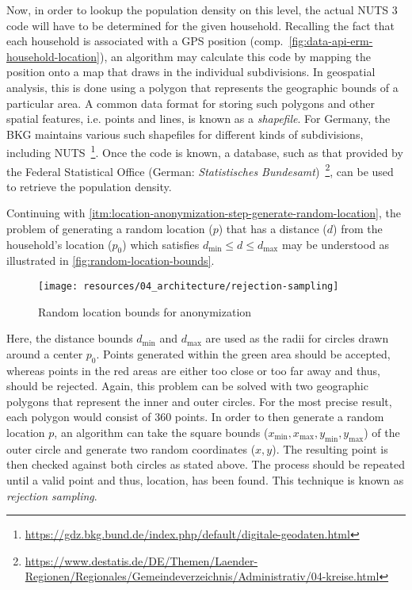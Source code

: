 Now, in order to lookup the population density on this level, the actual \acs{NUTS} 3 code will have to be determined for the given household. Recalling the fact that each household is associated with a \ac{GPS} position (comp.~\autoref{fig:data-api-erm-household-location}), an algorithm may calculate this code by mapping the position onto a map that draws in the individual subdivisions. In geospatial analysis, this is done using a polygon that represents the geographic bounds of a particular area. A common data format for storing such polygons and other spatial features, i.e. points and lines, is known as a \textit{shapefile}. For Germany, the \ac{BKG} maintains various such shapefiles for different kinds of subdivisions, including \acs{NUTS}~\footnote{\url{https://gdz.bkg.bund.de/index.php/default/digitale-geodaten.html}}. Once the code is known, a database, such as that provided by the Federal Statistical Office (German: \textit{Statistisches Bundesamt})~\footnote{\url{https://www.destatis.de/DE/Themen/Laender-Regionen/Regionales/Gemeindeverzeichnis/Administrativ/04-kreise.html}}, can be used to retrieve the population density.

Continuing with \ref{itm:location-anonymization-step-generate-random-location}, the problem of generating a random location ($p$) that has a distance ($d$) from the household's location ($p_0$) which satisfies $d_{\text{min}} \leq d \leq d_{\text{max}}$ may be understood as illustrated in \autoref{fig:random-location-bounds}.

\begin{figure}[hbt]
  \centering
  \texttt{[image: resources/04\_architecture/rejection-sampling]}
  \caption{Random location bounds for anonymization}
  \label{fig:random-location-bounds}
\end{figure}

Here, the distance bounds $d_{\text{min}}$ and $d_{\text{max}}$ are used as the radii for circles drawn around a center $p_0$. Points generated within the green area should be accepted, whereas points in the red areas are either too close or too far away and thus, should be rejected. Again, this problem can be solved with two geographic polygons that represent the inner and outer circles. For the most precise result, each polygon would consist of 360 points. In order to then generate a random location $p$, an algorithm can take the square bounds ($x_{\text{min}}, x_{\text{max}}, y_{\text{min}}, y_{\text{max}}$) of the outer circle and generate two random coordinates ($x,y$). The resulting point is then checked against both circles as stated above. The process should be repeated until a valid point and thus, location, has been found. This technique is known as \textit{rejection sampling}.


